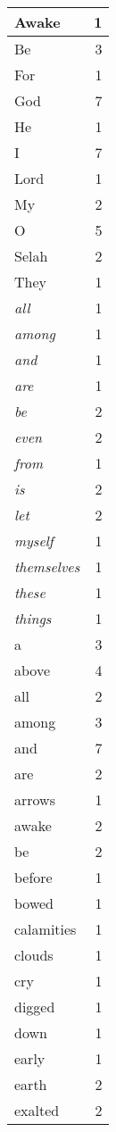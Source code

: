 \begin{center}
\begin{longtable}{l|r}
\hline \hline
\endlastfoot
Awake & 1 \\ \hline
Be & 3 \\ \hline
For & 1 \\ \hline
God & 7 \\ \hline
He & 1 \\ \hline
I & 7 \\ \hline
Lord & 1 \\ \hline
My & 2 \\ \hline
O & 5 \\ \hline
Selah & 2 \\ \hline
They & 1 \\ \hline
\emph{all} & 1 \\ \hline
\emph{among} & 1 \\ \hline
\emph{and} & 1 \\ \hline
\emph{are} & 1 \\ \hline
\emph{be} & 2 \\ \hline
\emph{even} & 2 \\ \hline
\emph{from} & 1 \\ \hline
\emph{is} & 2 \\ \hline
\emph{let} & 2 \\ \hline
\emph{myself} & 1 \\ \hline
\emph{themselves} & 1 \\ \hline
\emph{these} & 1 \\ \hline
\emph{things} & 1 \\ \hline
a & 3 \\ \hline
above & 4 \\ \hline
all & 2 \\ \hline
among & 3 \\ \hline
and & 7 \\ \hline
are & 2 \\ \hline
arrows & 1 \\ \hline
awake & 2 \\ \hline
be & 2 \\ \hline
before & 1 \\ \hline
bowed & 1 \\ \hline
calamities & 1 \\ \hline
clouds & 1 \\ \hline
cry & 1 \\ \hline
digged & 1 \\ \hline
down & 1 \\ \hline
early & 1 \\ \hline
earth & 2 \\ \hline
exalted & 2 \\ \hline

\end{longtable}
\end{center}
